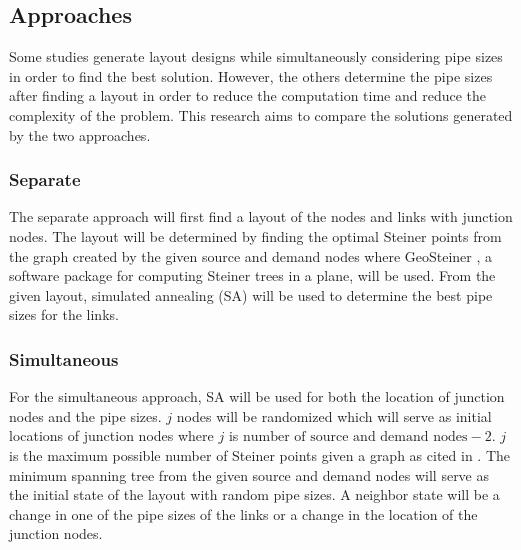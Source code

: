 \subsection{Approaches}
Some studies generate layout designs while simultaneously considering pipe sizes in order to find the best solution. However, the others determine the pipe sizes after finding a layout in order to reduce the computation time and reduce the complexity of the problem. This research aims to compare the solutions generated by the two approaches.

\subsubsection{Separate}
The separate approach will first find a layout of the nodes and links with junction nodes. The layout will be determined by finding the optimal Steiner points from the graph created by the given source and demand nodes where GeoSteiner \citep{Juhl2014}, a software package for computing Steiner trees in a plane, will be used. From the given layout, simulated annealing (SA) will be used to determine the best pipe sizes for the links.

\subsubsection{Simultaneous}
For the simultaneous approach, SA will be used for both the location of junction nodes and the pipe sizes. $j$ nodes will be randomized which will serve as initial locations of junction nodes where $j$ is $\text{number of source and demand nodes} - 2$. $j$ is the maximum possible number of Steiner points given a graph as cited in \cite{Lee1984}. The minimum spanning tree from the given source and demand nodes will serve as the initial state of the layout with random pipe sizes. A neighbor state will be a change in one of the pipe sizes of the links or a change in the location of the junction nodes.

